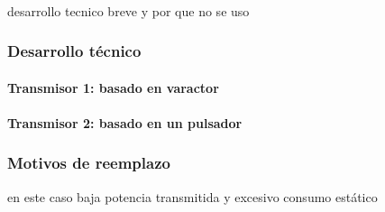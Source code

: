 \paragraph{}
desarrollo tecnico breve y por que no se uso

\subsubsection{Desarrollo técnico}
\paragraph{Transmisor 1: basado en varactor}
\paragraph{Transmisor 2: basado en un pulsador}
\subsubsection{Motivos de reemplazo}
en este caso baja potencia transmitida y excesivo consumo estático
